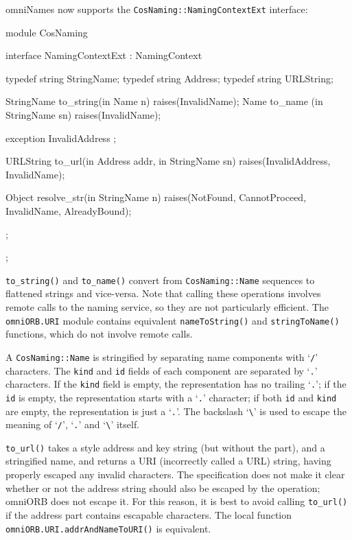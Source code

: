 \documentclass[11pt,twoside,a4paper]{book}
\newcommand{\type}[1]{\texttt{#1}}
\newcommand{\intf}[1]{\texttt{#1}}
\newcommand{\module}[1]{\texttt{#1}}
\newcommand{\code}[1]{\texttt{#1}}
\newcommand{\op}[1]{\texttt{#1()}}
\newcommand{\corbauri}{\begingroup \urlstyle{tt}\Url}
\begin{document}
omniNames now supports the \intf{CosNaming::NamingContextExt}
interface:

\begin{idllisting}
module CosNaming {
  interface NamingContextExt : NamingContext {
    typedef string StringName;
    typedef string Address;
    typedef string URLString;

    StringName  to_string(in Name n)        raises(InvalidName);
    Name        to_name  (in StringName sn) raises(InvalidName);

    exception InvalidAddress {};

    URLString   to_url(in Address addr, in StringName sn)
      raises(InvalidAddress, InvalidName);

    Object      resolve_str(in StringName n)
      raises(NotFound, CannotProceed, InvalidName, AlreadyBound);
  };
};
\end{idllisting}

\op{to\_string} and \op{to\_name} convert from \type{CosNaming::Name}
sequences to flattened strings and vice-versa.  Note that calling
these operations involves remote calls to the naming service, so they
are not particularly efficient. The \module{omniORB.URI} module
contains equivalent \op{nameToString} and \op{stringToName} functions,
which do not involve remote calls.

A \type{CosNaming::Name} is stringified by separating name components
with `\texttt{/}' characters. The \code{kind} and \code{id} fields of
each component are separated by `\texttt{.}' characters. If the
\code{kind} field is empty, the representation has no trailing
`\texttt{.}'; if the \code{id} is empty, the representation starts
with a `\texttt{.}' character; if both \texttt{id} and \texttt{kind}
are empty, the representation is just a `\texttt{.}'. The backslash
`\texttt{\textbackslash}' is used to escape the meaning of
`\texttt{/}', `\texttt{.}' and `\texttt{\textbackslash}' itself.

\op{to\_url} takes a \corbauri{corbaloc} style address and key string
(but without the \corbauri{corbaloc:} part), and a stringified name,
and returns a \corbauri{corbaname} URI (incorrectly called a URL)
string, having properly escaped any invalid characters. The
specification does not make it clear whether or not the address string
should also be escaped by the operation; omniORB does not escape
it. For this reason, it is best to avoid calling \op{to\_url} if the
address part contains escapable characters.  The local function
\op{omniORB.URI.addrAndNameToURI} is equivalent.
\end{document}

